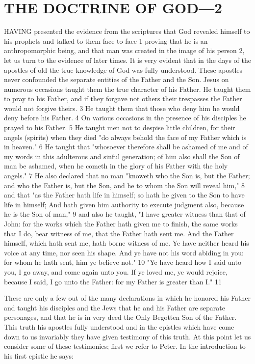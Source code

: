 \chapter{THE DOCTRINE OF GOD—2}

HAVING presented the evidence from the scriptures that God revealed himself to his
prophets and talked to them face to face 1 proving that he is an anthropomorphic being, and
that man was created in the image of his person 2, let us turn to the evidence of later times. It
is very evident that in the days of the apostles of old the true knowledge of God was fully
understood. These apostles never confounded the separate entities of the Father and the Son.
Jesus on numerous occasions taught them the true character of his Father. He taught them to
pray to his Father, and if they forgave not others their trespasses the Father would not forgive
theirs. 3 He taught them that those who deny him he would deny before his Father. 4 On
various occasions in the presence of his disciples he prayed to his Father. 5 He taught men
not to despise little children, for their angels (spirits) when they died "do always behold the
face of my Father which is in heaven." 6 He taught that "whosoever therefore shall be
ashamed of me and of my words in this adulterous and sinful generation; of him also shall
the Son of man be ashamed, when he cometh in the glory of his Father with the holy angels."
7 He also declared that no man "knoweth who the Son is, but the Father; and who the Father
is, but the Son, and he to whom the Son will reveal him," 8 and that "as the Father hath life in
himself; so hath he given to the Son to have life in himself; And hath given him authority to
execute judgment also, because he is the Son of man," 9 and also he taught, "I have greater
witness than that of John: for the works which the Father hath given me to finish, the same
works that I do, bear witness of me, that the Father hath sent me. And the Father himself,
which hath sent me, hath borne witness of me. Ye have neither heard his voice at any time,
nor seen his shape. And ye have not his word abiding in you: for whom he hath sent, him ye
believe not." 10 "Ye have heard how I said unto you, I go away, and come again unto you. If
ye loved me, ye would rejoice, because I said, I go unto the Father: for my Father is greater
than I." 11

These are only a few out of the many declarations in which he honored his Father and taught
his disciples and the Jews that he and his Father are separate personages, and that he is in
very deed the Only Begotten Son of the Father. This truth his apostles fully understood and
in the epistles which have come down to us invariably they have given testimony of this
truth. At this point let us consider some of these testimonies; first we refer to Peter. In the
introduction to his first epistle he says:

